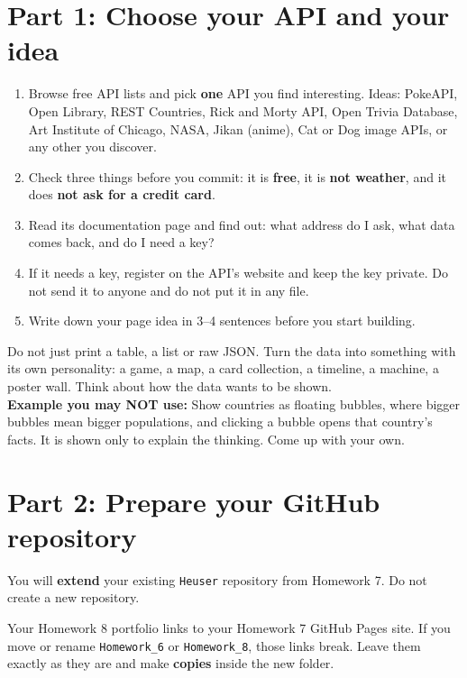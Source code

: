 \documentclass[11pt,a4paper]{article}
\begin{document}
\section{Part 1: Choose your API and your idea}
\begin{enumerate}
\item Browse free API lists and pick \textbf{one} API you find interesting. Ideas: PokeAPI, Open Library, REST Countries, Rick and Morty API, Open Trivia Database, Art Institute of Chicago, NASA, Jikan (anime), Cat or Dog image APIs, or any other you discover.
\item Check three things before you commit: it is \textbf{free}, it is \textbf{not weather}, and it does \textbf{not ask for a credit card}.
\item Read its documentation page and find out: what address do I ask, what data comes back, and do I need a key?
\item If it needs a key, register on the API's website and keep the key private. Do not send it to anyone and do not put it in any file.
\item Write down your page idea in 3--4 sentences before you start building.
\end{enumerate}

\begin{note}
Do not just print a table, a list or raw JSON. Turn the data into something with its own personality: a game, a map, a card collection, a timeline, a machine, a poster wall. Think about how the data wants to be shown.\\[2pt]
\textbf{Example you may NOT use:} Show countries as floating bubbles, where bigger bubbles mean bigger populations, and clicking a bubble opens that country's facts. It is shown only to explain the thinking. Come up with your own.
\end{note}

\section{Part 2: Prepare your GitHub repository}
You will \textbf{extend} your existing \texttt{Heuser} repository from Homework 7. Do not create a new repository.

\begin{warn}
Your Homework 8 portfolio links to your Homework 7 GitHub Pages site. If you move or rename \texttt{Homework\_6} or \texttt{Homework\_8}, those links break. Leave them exactly as they are and make \textbf{copies} inside the new folder.
\end{warn}
\end{document}
